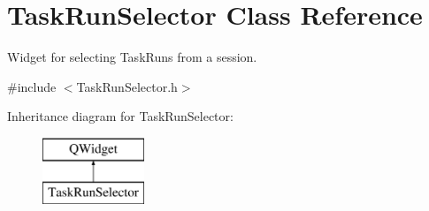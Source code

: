 \hypertarget{class_task_run_selector}{\section{Task\-Run\-Selector Class Reference}
\label{class_task_run_selector}
}


Widget for selecting Task\-Runs from a session.  




{\ttfamily \#include $<$Task\-Run\-Selector.\-h$>$}

Inheritance diagram for Task\-Run\-Selector\-:\begin{figure}[H]
\begin{center}
\leavevmode
\includegraphics[height=2.000000cm]{class_task_run_selector}
\end{center}
\end{figure}
